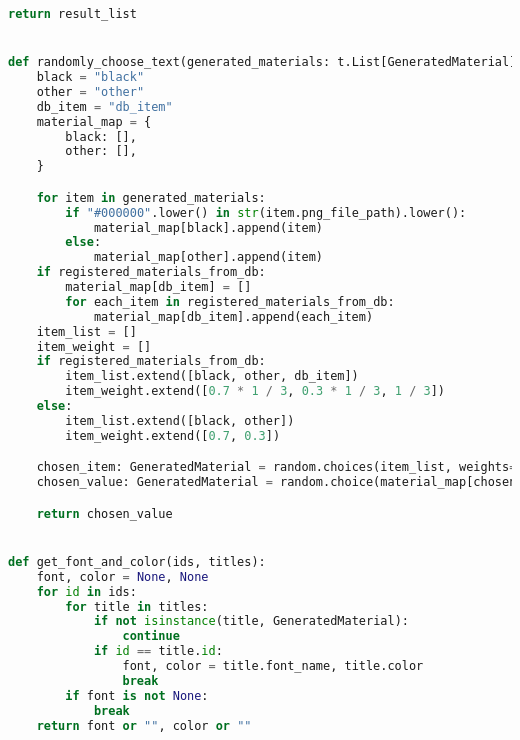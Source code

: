 \begin{lstlisting}[language=Python,caption={Text-ээс PNG зураг үүсгэдэг script},frame=single]
    return result_list


def randomly_choose_text(generated_materials: t.List[GeneratedMaterial], registered_materials_from_db):
    black = "black"
    other = "other"
    db_item = "db_item"
    material_map = {
        black: [],
        other: [],
    }

    for item in generated_materials:
        if "#000000".lower() in str(item.png_file_path).lower():
            material_map[black].append(item)
        else:
            material_map[other].append(item)
    if registered_materials_from_db:
        material_map[db_item] = []
        for each_item in registered_materials_from_db:
            material_map[db_item].append(each_item)
    item_list = []
    item_weight = []
    if registered_materials_from_db:
        item_list.extend([black, other, db_item])
        item_weight.extend([0.7 * 1 / 3, 0.3 * 1 / 3, 1 / 3])
    else:
        item_list.extend([black, other])
        item_weight.extend([0.7, 0.3])

    chosen_item: GeneratedMaterial = random.choices(item_list, weights=item_weight)[0]
    chosen_value: GeneratedMaterial = random.choice(material_map[chosen_item])

    return chosen_value


def get_font_and_color(ids, titles):
    font, color = None, None
    for id in ids:
        for title in titles:
            if not isinstance(title, GeneratedMaterial):
                continue
            if id == title.id:
                font, color = title.font_name, title.color
                break
        if font is not None:
            break
    return font or "", color or ""
\end{lstlisting}